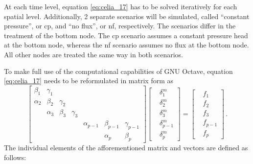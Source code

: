 At each time level, equation \eqref{eq:celia_17} has to be solved iteratively for each spatial level.  Additionally, 2 separate scenarios will be simulated, called ``constant pressure'', or cp,  and ``no flux'', or nf, respectively.  The scenarios differ in the treatment of the bottom node.  The cp scenario assumes a constant pressure head at the bottom node, whereas the nf scenario assumes no flux at the bottom node.  All other nodes are treated the same way in both scenarios.

To make full use of the computational capabilities of GNU Octave, equation \eqref{eq:celia_17} needs to be reformulated in matrix form as \parencite{lier_root_2006}
\begin{equation*}
  \begin{bmatrix}
    \beta_1 & \gamma_1 & & & & & \\
    \alpha_2 & \beta_2 & \gamma_2 & & & & \\
    & \alpha_3 & \beta_3 & \gamma_3 & & & \\
    & & & & \alpha_{p-1} & \beta_{p-1} & \gamma_{p-1} \\
    & & & & & \alpha_p & \beta_p
  \end{bmatrix}
  \begin{bmatrix}
    &\delta_1^m \\
    &\delta_2^m \\
    &\delta_3^m \\
    &\delta_{p-1}^m \\
    &\delta_p^m
  \end{bmatrix} =
  \begin{bmatrix}
    &f_1 \\
    &f_2 \\
    &f_3 \\
    &f_{p-1} \\
    &f_p
  \end{bmatrix} \, .
\end{equation*}
The individual elements of the afforementioned matrix and vectors are defined as follows:

